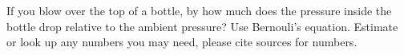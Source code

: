  If you blow over the top of a bottle, by how much does the pressure inside the
bottle drop relative to the ambient pressure?  Use Bernouli's equation.  Estimate or look up any numbers you may
need, please cite sources for numbers.      

